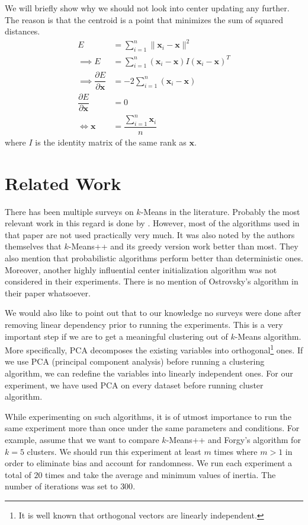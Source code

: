 \documentclass[twoside, 11pt]{article}
\newcommand{\x}{\mathbf{x}}
\begin{document}
	We will briefly show why we should not look into center updating any further. The reason is that the centroid is a point that minimizes the sum of squared distances.
		\begin{align*}
			E & = \sum_{i=1}^n\|\x_i-\x\|^2\\
			\implies E & = \sum_{i=1}^n(\x_i-\x)I(\x_i-\x)^{T}\\
			\implies \dfrac{\partial{E}}{\partial{\x}} & = -2\sum_{i=1}^n(\x_i-\x)\\
			\dfrac{\partial{E}}{\partial{\x}} & = 0\\
			\iff \x & = \dfrac{\sum_{i=1}^n\x_i}{n}
		\end{align*}
	where $I$ is the identity matrix of the same rank as $\x$.
	\section{Related Work}
	There has been multiple surveys on $k$-Means in the literature. Probably the most relevant work in this regard is done by \cite{celebi}. However, most of the algorithms used in that paper are not used practically very much. It was also noted by the authors themselves that $k$-Means++ and its greedy version work better than most. They also mention that probabilistic algorithms perform better than deterministic ones. Moreover, another highly influential center initialization algorithm \citep{ostrovsky} was not considered in their experiments. There is no mention of Ostrovsky's algorithm in their paper whatsoever.
	
	We would also like to point out that to our knowledge no surveys were done after removing linear dependency prior to running the experiments. This is a very important step if we are to get a meaningful clustering out of $k$-Means algorithm. More specifically, PCA decomposes the existing variables into orthogonal\footnote{It is well known that orthogonal vectors are linearly independent.} ones. If we use PCA (principal component analysis) before running a clustering algorithm, we can redefine the variables into linearly independent ones. For our experiment, we have used PCA on every dataset before running cluster algorithm.
	
	While experimenting on such algorithms, it is of utmost importance to run the same experiment more than once under the same parameters and conditions. For example, assume that we want to compare $k$-Means++ and Forgy's algorithm \citep{forgy} for $k=5$ clusters. We should run this experiment at least $m$ times where $m>1$ in order to eliminate bias and account for randomness. We run each experiment a total of $20$ times and take the average and minimum values of inertia. The number of iterations was set to $300$.
\end{document}
